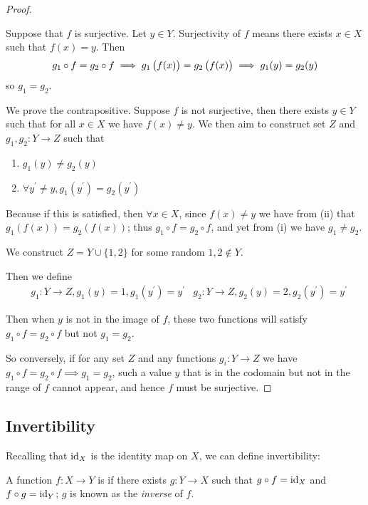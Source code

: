 \begin{proof} \

\fbox{$\implies$} Suppose that $f$ is surjective. Let $y\in Y$. Surjectivity of $f$ means there exists $x\in X$ such that $f(x)=y$. Then
\[g_1\circ f=g_2 \circ f\implies g_1\left(f(x)\right)=g_2\left(f(x)\right)\implies g_1(y)=g_2(y) \]
so $g_1=g_2$.

\fbox{$\impliedby$} We prove the contrapositive. Suppose $f$ is not surjective, then there exists $y \in Y$ such that for all $x \in X$ we have $f(x)\neq y$. We then aim to construct set $Z$ and $g_1,g_2:Y\to Z$ such that
\begin{enumerate}[label=(\roman*)]
\item $g_1(y) \neq g_2(y)$
\item $\forall y^\prime \neq y, g_1(y^\prime)=g_2(y^\prime)$
\end{enumerate}

Because if this is satisfied, then $\forall x \in X$, since $f(x)\neq y$ we have from (ii) that $g_1(f(x))=g_2(f(x))$; thus $g_1 \circ f=g_2 \circ f$, and yet from (i) we have $g_1 \neq g_2$.

We construct $Z=Y\cup\{1,2\}$ for some random $1,2 \notin Y$.

Then we define
\begin{align*}
&g_1:Y\to Z,g_1(y)=1,g_1(y^\prime)=y^\prime
&g_2:Y\to Z,g_2(y)=2,g_2(y^\prime)=y^\prime
\end{align*}

Then when $y$ is not in the image of $f$, these two functions will satisfy $g_1 \circ f=g_2 \circ f$ but not $g_1=g_2$.

So conversely, if for any set $Z$ and any functions $g_i:Y \to Z$ we have $g_1 \circ f=g_2 \circ f \implies g_1=g_2$, such a value $y$ that is in the codomain but not in the range of $f$ cannot appear, and hence $f$ must be surjective.
\end{proof}

\subsection{Invertibility}
Recalling that $\operatorname{id}_X$ is the identity map on $X$, we can define invertibility:

\begin{definition}[Invertibility]
A function $f:X\to Y$ is  if there exists $g:Y\to X$ such that $g\circ f=\operatorname{id}_X$ and $f\circ g=\operatorname{id}_Y$; $g$ is known as the \emph{inverse} of $f$.
\end{definition}

